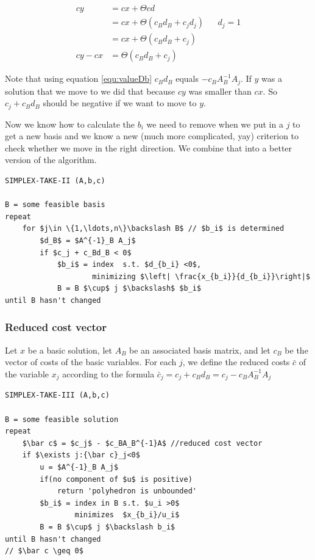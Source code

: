 \begin{align*}
cy &= cx + \Theta cd\\
    &= cx + \Theta (c_Bd_B + c_jd_j) &&d_j=1\\
    &= cx + \Theta (c_Bd_B + c_j)\\
cy - cx &= \Theta (c_Bd_B +c_j)
\end{align*}

Note that using equation \ref{equ:valueDb} $c_Bd_B$ equals $- c_B A^{-1}_B A_j$.
If $y$ was a solution that we move to we did that because $cy$ was smaller than $cx$. So $c_j + c_Bd_B$ should be negative if we want to move to $y$. 

Now we know how to calculate the $b_i$ we need to remove when we put in a $j$ to get a new basis and we know a new (much more complicated, yay) criterion to check whether we move in the right direction. We combine that into a better version of the algorithm.

\begin{center}
\begin{lstlisting}
SIMPLEX-TAKE-II (A,b,c)

B = some feasible basis
repeat 
    for $j\in \{1,\ldots,n\}\backslash B$ // $b_i$ is determined
        $d_B$ = $A^{-1}_B A_j$
        if $c_j + c_Bd_B < 0$
            $b_i$ = index  s.t. $d_{b_i} <0$, 
                    minimizing $\left| \frac{x_{b_i}}{d_{b_i}}\right|$
            B = B $\cup$ j $\backslash$ $b_i$
until B hasn't changed
\end{lstlisting}
\end{center}

\subsubsection*{Reduced cost vector}
\begin{Def}
 Let $x$ be a basic solution, let $A_B$ be an associated basis matrix, and let $c_B$ be the vector of costs of the basic variables. For each $j$, we define the reduced costs $\bar c$ of the variable $x_j$ according to the formula 
$\bar c_j = c_j + c_Bd_B = c_j - c_B A^{-1}_B A_j$
\end{Def}


\begin{center}
\begin{lstlisting}
SIMPLEX-TAKE-III (A,b,c)

B = some feasible solution
repeat
    $\bar c$ = $c_j$ - $c_BA_B^{-1}A$ //reduced cost vector
    if $\exists j:{\bar c}_j<0$ 
        u = $A^{-1}_B A_j$ 
        if(no component of $u$ is positive)
            return 'polyhedron is unbounded'
        $b_i$ = index in B s.t. $u_i >0$ 
                minimizes  $x_{b_i}/u_i$
        B = B $\cup$ j $\backslash b_i$ 
until B hasn't changed 
// $\bar c \geq 0$ 
\end{lstlisting}
\end{center}


